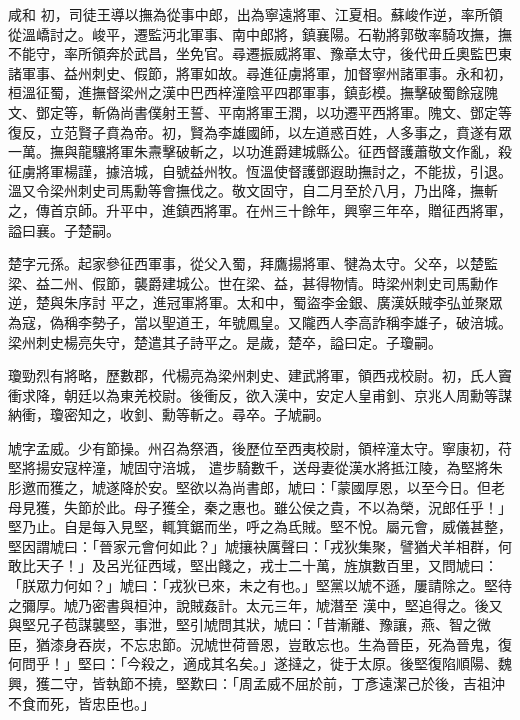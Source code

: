 \begin{pinyinscope}
 咸和
 初，司徒王導以撫為從事中郎，出為寧遠將軍、江夏相。蘇峻作逆，率所領從溫嶠討之。峻平，遷監沔北軍事、南中郎將，鎮襄陽。石勒將郭敬率騎攻撫，撫不能守，率所領奔於武昌，坐免官。尋遷振威將軍、豫章太守，後代毌丘奧監巴東諸軍事、益州刺史、假節，將軍如故。尋進征虜將軍，加督寧州諸軍事。永和初，桓溫征蜀，進撫督梁州之漢中巴西梓潼陰平四郡軍事，鎮彭模。撫擊破蜀餘寇隗文、鄧定等，斬偽尚書僕射王誓、平南將軍王潤，以功遷平西將軍。隗文、鄧定等復反，立范賢子賁為帝。初，賢為李雄國師，以左道惑百姓，人多事之，賁遂有眾
 一萬。撫與龍驤將軍朱燾擊破斬之，以功進爵建城縣公。征西督護蕭敬文作亂，殺征虜將軍楊謹，據涪城，自號益州牧。恆溫使督護鄧遐助撫討之，不能拔，引退。溫又令梁州刺史司馬勳等會撫伐之。敬文固守，自二月至於八月，乃出降，撫斬之，傳首京師。升平中，進鎮西將軍。在州三十餘年，興寧三年卒，贈征西將軍，謚曰襄。子楚嗣。



 楚字元孫。起家參征西軍事，從父入蜀，拜鷹揚將軍、犍為太守。父卒，以楚監梁、益二州、假節，襲爵建城公。世在梁、益，甚得物情。時梁州刺史司馬勳作逆，楚與朱序討
 平之，進冠軍將軍。太和中，蜀盜李金銀、廣漢妖賊李弘並聚眾為寇，偽稱李勢子，當以聖道王，年號鳳皇。又隴西人李高詐稱李雄子，破涪城。梁州刺史楊亮失守，楚遣其子詩平之。是歲，楚卒，謚曰定。子瓊嗣。



 瓊勁烈有將略，歷數郡，代楊亮為梁州刺史、建武將軍，領西戎校尉。初，氏人竇衝求降，朝廷以為東羌校尉。後衝反，欲入漢中，安定人皇甫釗、京兆人周勳等謀納衝，瓊密知之，收釗、勳等斬之。尋卒。子虓嗣。



 虓字孟威。少有節操。州召為祭酒，後歷位至西夷校尉，領梓潼太守。寧康初，苻堅將揚安寇梓潼，虓固守涪城，
 遣步騎數千，送母妻從漢水將抵江陵，為堅將朱肜邀而獲之，虓遂降於安。堅欲以為尚書郎，虓曰：「蒙國厚恩，以至今日。但老母見獲，失節於此。母子獲全，秦之惠也。雖公侯之貴，不以為榮，況郎任乎！」堅乃止。自是每入見堅，輒箕鋸而坐，呼之為氐賊。堅不悅。屬元會，威儀甚整，堅因謂虓曰：「晉家元會何如此？」虓攘袂厲聲曰：「戎狄集聚，譬猶犬羊相群，何敢比天子！」及呂光征西域，堅出餞之，戎士二十萬，旌旗數百里，又問虓曰：「朕眾力何如？」虓曰：「戎狄已來，未之有也。」堅黨以虓不遜，屢請除之。堅待之彌厚。虓乃密書與桓沖，說賊姦計。太元三年，虓潛至
 漢中，堅追得之。後又與堅兄子苞謀襲堅，事泄，堅引虓問其狀，虓曰：「昔漸離、豫讓，燕、智之微臣，猶漆身吞炭，不忘忠節。況虓世荷晉恩，豈敢忘也。生為晉臣，死為晉鬼，復何問乎！」堅曰：「今殺之，適成其名矣。」遂撻之，徙于太原。後堅復陷順陽、魏興，獲二守，皆執節不撓，堅歎曰：「周孟威不屈於前，丁彥遠潔己於後，吉祖沖不食而死，皆忠臣也。」




\end{pinyinscope}
